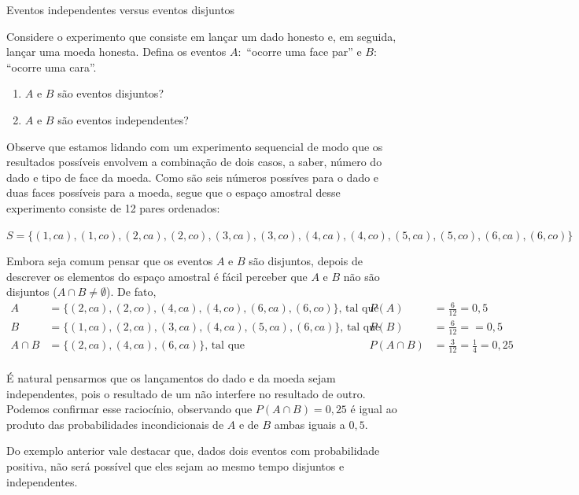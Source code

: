\begin{example}{Eventos independentes versus eventos disjuntos}

Considere o experimento que consiste em lançar um dado honesto e, em seguida, lançar uma moeda honesta. Defina os eventos \(A:\) “ocorre uma face par” e \(B:\) “ocorre uma cara”.
\begin{enumerate}
\item {} 
\(A\) e \(B\) são eventos disjuntos?

\item {} 
\(A\) e \(B\) são eventos independentes?

\end{enumerate}

Observe que estamos lidando com um experimento sequencial de modo que os resultados possíveis envolvem a combinação de dois casos, a saber, número do dado e tipo de face da moeda. Como são seis números possíves para o dado e duas faces possíveis para a moeda, segue que o espaço amostral desse experimento consiste de 12 pares ordenados:

\(S=\{(1,ca),(1,co),(2,ca),(2,co),(3,ca),(3,co),(4,ca),(4,co),(5,ca),(5,co),(6,ca),(6,co)\}\)

Embora seja comum pensar que os eventos \(A\) e \(B\) são disjuntos, depois de descrever os elementos do espaço amostral é fácil perceber que $A$ e  $B$ não são disjuntos (\(A\cap B\neq \emptyset\)). De fato,
\begin{align*}
A&=\{(2,ca),(2,co),(4,ca),(4,co),(6,ca),(6,co)\}\text{, tal que } &P(A)&=\frac{6}{12}=0,5\\
B&=\{(1,ca),(2,ca),(3,ca),(4,ca),(5,ca),(6,ca)\} \text{, tal que } &P(B)&=\frac{6}{12}==0,5\\
A\cap B&=\{(2,ca),(4,ca),(6,ca)\} \text{, tal que }&P(A\cap B)&=\frac{3}{12}=\frac{1}{4}=0,25\\
\end{align*}

É natural pensarmos que os lançamentos do dado e da moeda sejam independentes, pois o resultado de um não interfere no resultado de outro. Podemos confirmar esse raciocínio, observando que \(P(A\cap B)=0,25\) é igual ao produto das probabilidades incondicionais de \(A\) e de \(B\)  ambas iguais a $0,5$.
\end{example}

Do exemplo anterior vale destacar que, dados dois eventos com probabilidade positiva, não será possível que eles sejam ao mesmo tempo disjuntos e independentes.

